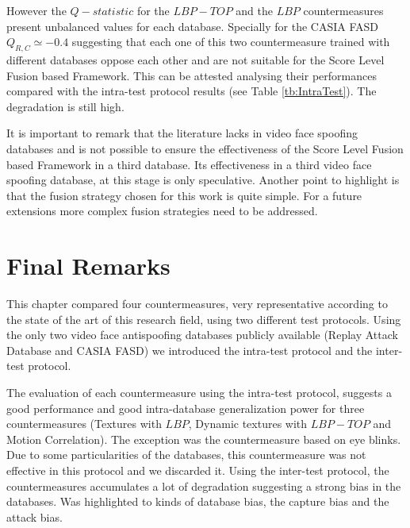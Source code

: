 However the $Q-statistic$ for the $LBP-TOP$ and the $LBP$ countermeasures present unbalanced values for each database. Specially for the CASIA FASD $Q_{R,C}\simeq-0.4$ suggesting that each one of this two countermeasure trained with different databases oppose each other and are not suitable for the Score Level Fusion based Framework. This can be attested analysing their performances compared with the intra-test protocol results (see Table \ref{tb:IntraTest}). The degradation is still high.


It is important to remark that the literature lacks in video face spoofing databases and is not possible to ensure the effectiveness of the Score Level Fusion based Framework in a third database. Its effectiveness in a third video face spoofing database, at this stage is only speculative. Another point to highlight is that the fusion strategy chosen for this work is quite simple. For a future extensions more complex fusion strategies need to be addressed.

\section{Final Remarks}
\label{sec:Experiments_finalremarks}

This chapter compared four countermeasures, very representative according to the state of the art of this research field, using two different test protocols. Using the only two video face antispoofing databases publicly available (Replay Attack Database and CASIA FASD) we introduced the intra-test protocol and the inter-test protocol.

The evaluation of each countermeasure using the intra-test protocol, suggests a good performance and good intra-database generalization power for three countermeasures (Textures with $LBP$, Dynamic textures with $LBP-TOP$  and Motion Correlation). The exception was the countermeasure based on eye blinks. Due to some particularities of the databases, this countermeasure was not effective in this protocol and we discarded it. Using the inter-test protocol, the countermeasures accumulates a lot of degradation suggesting a strong bias in the databases. Was highlighted to kinds of database bias, the capture bias and the attack bias.

